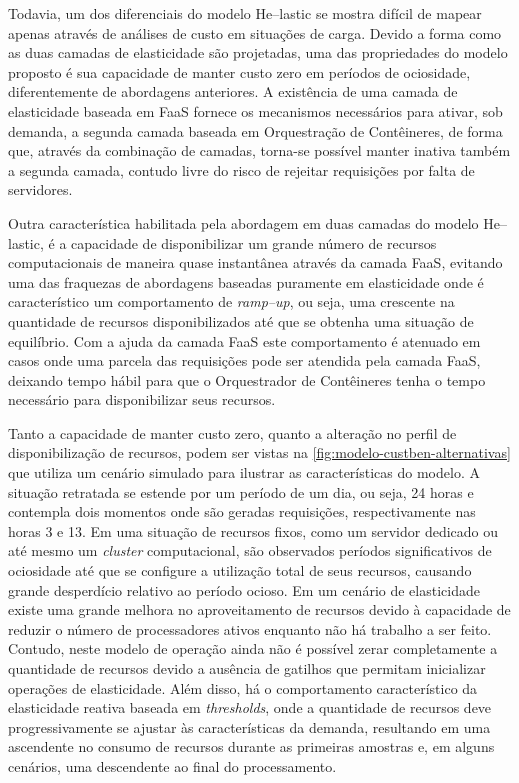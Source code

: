 \documentclass[english,brazilian]{UNISINOSmonografia} %
\begin{document}
Todavia, um dos diferenciais do modelo \textsf{He}--lastic se mostra difícil de mapear apenas através de análises de custo em situações de carga.
Devido a forma como as duas camadas de elasticidade são projetadas, uma das propriedades do modelo proposto é sua capacidade de manter custo zero em períodos de ociosidade, diferentemente de abordagens anteriores.
A existência de uma camada de elasticidade baseada em FaaS fornece os mecanismos necessários para ativar, sob demanda, a segunda camada baseada em Orquestração de Contêineres, de forma que, através da combinação de camadas, torna-se possível manter inativa também a segunda camada, contudo livre do risco de rejeitar requisições por falta de servidores.


Outra característica habilitada pela abordagem em duas camadas do modelo \textsf{He}--lastic, é a capacidade de disponibilizar um grande número de recursos computacionais de maneira quase instantânea através da camada FaaS, evitando uma das fraquezas de abordagens baseadas puramente em elasticidade onde é característico um comportamento de \textit{ramp--up}, ou seja, uma crescente na quantidade de recursos disponibilizados até que se obtenha uma situação de equilíbrio.
Com a ajuda da camada FaaS este comportamento é atenuado em casos onde uma parcela das requisições pode ser atendida pela camada FaaS, deixando tempo hábil para que o Orquestrador de Contêineres tenha o tempo necessário para disponibilizar seus recursos.


Tanto a capacidade de manter custo zero, quanto a alteração no perfil de disponibilização de recursos, podem ser vistas na \autoref{fig:modelo-custben-alternativas} que utiliza um cenário simulado para ilustrar as características do modelo.
A situação retratada se estende por um período de um dia, ou seja, 24 horas e contempla dois momentos onde são geradas requisições, respectivamente nas horas 3 e 13.
Em uma situação de recursos fixos, como um servidor dedicado ou até mesmo um \textit{cluster} computacional, são observados períodos significativos de ociosidade até que se configure a utilização total de seus recursos, causando grande desperdício relativo ao período ocioso.
Em um cenário de elasticidade existe uma grande melhora no aproveitamento de recursos devido à capacidade de reduzir o número de processadores ativos enquanto não há trabalho a ser feito.
Contudo, neste modelo de operação ainda não é possível zerar completamente a quantidade de recursos devido a ausência de gatilhos que permitam inicializar operações de elasticidade.
Além disso, há o comportamento característico da elasticidade reativa baseada em \textit{thresholds}, onde a quantidade de recursos deve progressivamente se ajustar às características da demanda, resultando em uma ascendente no consumo de recursos durante as primeiras amostras e, em alguns cenários, uma descendente ao final do processamento.
\end{document}
